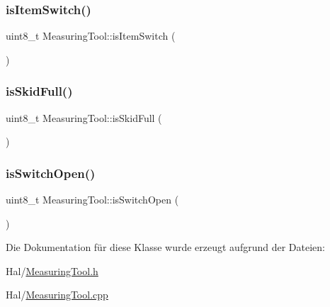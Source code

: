 \subsubsection{\texorpdfstring{is\+Item\+Switch()}{isItemSwitch()}}
{\footnotesize\ttfamily uint8\+\_\+t Measuring\+Tool\+::is\+Item\+Switch (\begin{DoxyParamCaption}{ }\end{DoxyParamCaption})}

\hypertarget{class_measuring_tool_a33ece6093e5b77f9353f86d2d9be64f6}{}\label{class_measuring_tool_a33ece6093e5b77f9353f86d2d9be64f6} 
\subsubsection{\texorpdfstring{is\+Skid\+Full()}{isSkidFull()}}
{\footnotesize\ttfamily uint8\+\_\+t Measuring\+Tool\+::is\+Skid\+Full (\begin{DoxyParamCaption}{ }\end{DoxyParamCaption})}

\hypertarget{class_measuring_tool_ad46b12c36f63fa9b597b1df6468d6aac}{}\label{class_measuring_tool_ad46b12c36f63fa9b597b1df6468d6aac} 
\subsubsection{\texorpdfstring{is\+Switch\+Open()}{isSwitchOpen()}}
{\footnotesize\ttfamily uint8\+\_\+t Measuring\+Tool\+::is\+Switch\+Open (\begin{DoxyParamCaption}{ }\end{DoxyParamCaption})}



Die Dokumentation für diese Klasse wurde erzeugt aufgrund der Dateien\+:\begin{DoxyCompactItemize}
\item 
Hal/\hyperlink{_measuring_tool_8h}{Measuring\+Tool.\+h}\item 
Hal/\hyperlink{_measuring_tool_8cpp}{Measuring\+Tool.\+cpp}\end{DoxyCompactItemize}
